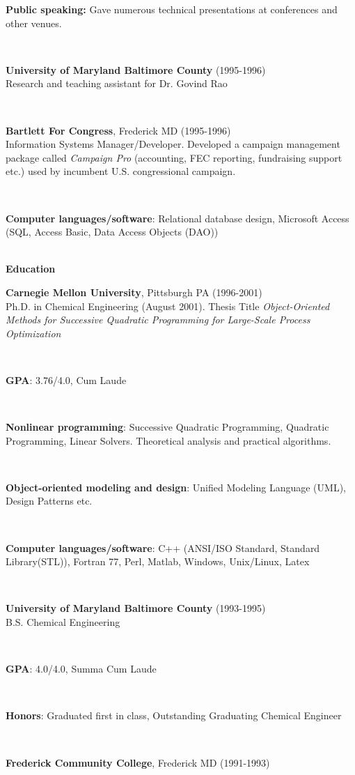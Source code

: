 \documentclass{report}
\newcommand{\itemvs}{1ex}
\newcommand{\sectitlevs}{1.2ex}
\newcommand{\indentone}{0.5in}
\newcommand{\widthone}{6.4in}
\newcommand{\pboxone}{\hspace*{\indentone}\parbox[t]{\widthone}}
\newcommand{\indenttwo}{0.75in}
\newcommand{\widthtwo}{6.15in}
\newcommand{\pboxtwo}{\hspace*{\indenttwo}\parbox[t]{\widthtwo}}
\begin{document}
%
{}\pboxtwo{\textbf{Public speaking:} Gave numerous technical presentations at conferences and other venues.} \\[\sectitlevs]
%
{}\pboxone{\textbf{University of Maryland Baltimore County} (1995-1996)\\ Research and teaching assistant for Dr. Govind Rao}\\[\sectitlevs]
%
{}\pboxone{\textbf{Bartlett For Congress}, Frederick MD (1995-1996)\\
Information Systems Manager/Developer.  Developed a campaign management package called \textit{Campaign Pro} (accounting, FEC reporting, fundraising support etc.) used by incumbent U.S. congressional campaign.}\\[\itemvs]
%
{}\pboxtwo{\textbf{Computer languages/software}: Relational database design, Microsoft Access (SQL, Access Basic, Data Access Objects (DAO))} \\[\sectitlevs]
%
\textbf{\Large Education}\\[\sectitlevs]
%
{}\pboxone{\textbf{Carnegie Mellon University}, Pittsburgh PA (1996-2001)\\ Ph.D. in Chemical Engineering (August 2001).  Thesis Title {}\textit{Object-Oriented Methods for Successive Quadratic Programming for Large-Scale Process Optimization}}\\[\itemvs]
%
{}\pboxtwo{\textbf{GPA}: 3.76/4.0, Cum Laude} \\[\itemvs]
%
{}\pboxtwo{\textbf{Nonlinear programming}: Successive Quadratic Programming, Quadratic Programming, Linear Solvers.  Theoretical analysis and practical algorithms.} \\[\itemvs]
%
{}\pboxtwo{\textbf{Object-oriented modeling and design}: Unified Modeling Language (UML), Design Patterns etc.}\\[\itemvs]
%
{}\pboxtwo{\textbf{Computer languages/software}: C++ (ANSI/ISO Standard, Standard Library(STL)), Fortran 77, Perl, Matlab, Windows, Unix/Linux, Latex}\\[\itemvs]
%
{}\pboxone{\textbf{University of Maryland Baltimore County} (1993-1995) \\ B.S. Chemical Engineering} \\[\itemvs]
%
{}\pboxtwo{\textbf{GPA}: 4.0/4.0, Summa Cum Laude} \\[\itemvs]
%
{}\pboxtwo{\textbf{Honors}: Graduated first in class, Outstanding Graduating Chemical Engineer} \\[\itemvs]
%
{}\pboxone{\textbf{Frederick Community College}, Frederick MD
(1991-1993)}\\
\end{document}
